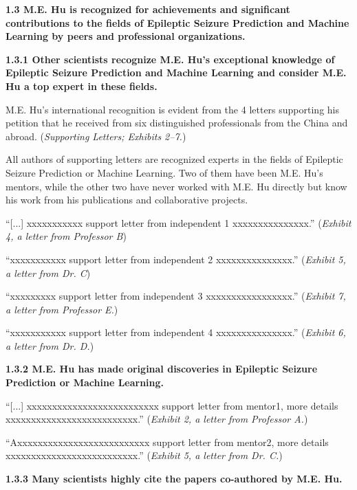 \documentclass{article}
\begin{document}
{\bf 1.3 M.E. Hu is recognized for achievements and significant contributions to the fields of Epileptic Seizure Prediction and Machine Learning by peers and professional organizations. }

{\bf 1.3.1 Other scientists recognize M.E. Hu’s exceptional knowledge of Epileptic Seizure Prediction and Machine Learning and consider M.E. Hu a top expert in these fields.}

M.E. Hu's international recognition is evident from the 4 letters supporting his petition that he received from six distinguished professionals from the China and abroad. ({\it Supporting Letters; Exhibits 2–7.}) 

All authors of supporting letters are recognized experts in the fields of Epileptic Seizure Prediction or Machine Learning. Two of them have been M.E. Hu’s mentors, while the other two have never worked with M.E. Hu directly but know his work from his publications and collaborative projects. 

“[...] xxxxxxxxxxx support letter from independent 1 xxxxxxxxxxxxxxx.” ({\it Exhibit 4, a letter from Professor B})

“xxxxxxxxxxx support letter from independent 2 xxxxxxxxxxxxxxx.” ({\it Exhibit 5, a letter from Dr. C})

“xxxxxxxxx  support letter from independent 3 xxxxxxxxxxxxxxxxx.” ({\it Exhibit 7, a letter from Professor E.})

“xxxxxxxxxxx support letter from independent 4 xxxxxxxxxxxxxxx.” ({\it Exhibit 6, a letter from Dr. D.})

{\bf 1.3.2 M.E. Hu has made original discoveries in Epileptic Seizure Prediction or Machine Learning. }

“[...] xxxxxxxxxxxxxxxxxxxxxxxxxx support letter from mentor1, more details xxxxxxxxxxxxxxxxxxxxxxxxxx.” ({\it Exhibit 2, a letter from Professor A.}) 

“Axxxxxxxxxxxxxxxxxxxxxxxxxx support letter from mentor2, more details xxxxxxxxxxxxxxxxxxxxxxxxxx.” ({\it Exhibit 5, a letter from Dr. C.}) 

{\bf 1.3.3 Many scientists highly cite the papers co-authored by M.E. Hu. }
\end{document}
